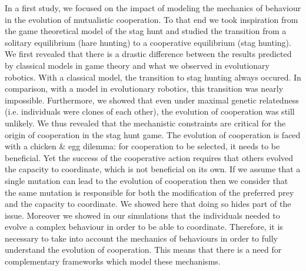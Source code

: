 		In a first study, we focused on the impact of modeling the mechanics of behaviour in the evolution of mutualistic cooperation. To that end we took inspiration from the game theoretical model of the stag hunt and studied the transition from a solitary equilibrium (hare hunting) to a cooperative equilibrium (stag hunting). We first revealed that there is a drastic difference between the results predicted by classical models in game theory and what we observed in evolutionary robotics. With a classical model, the transition to stag hunting always occured. In comparison, with a model in evolutionary robotics, this transition was nearly impossible. Furthermore, we showed that even under maximal genetic relatedness (i.e. individuals were clones of each other), the evolution of cooperation was still unlikely. We thus revealed that the mechanistic constraints are critical for the origin of cooperation in the stag hunt game. The evolution of cooperation is faced with a chicken \& egg dilemma: for cooperation to be selected, it needs to be beneficial. Yet the success of the cooperative action requires that others evolved the capacity to coordinate, which is not beneficial on its own. If we assume that a single mutation can lead to the evolution of cooperation then we consider that the same mutation is responsible for both the modification of the preferred prey and the capacity to coordinate. We showed here that doing so hides part of the issue. Moreover we showed in our simulations that the individuals needed to evolve a complex behaviour in order to be able to coordinate. Therefore, it is necessary to take into account the mechanics of behaviours in order to fully understand the evolution of cooperation. This means that there is a need for complementary frameworks which model these mechanisms.

